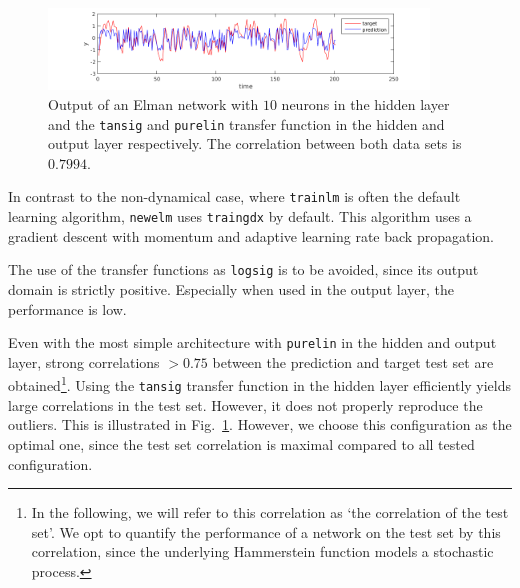 \documentclass[pdftex,11pt,a4paper]{article}
\begin{document}
\begin{figure}[tbh]
\centering
\includegraphics[width=0.9\textwidth]{figs/tansig_purelin.png}
\caption{Output of an Elman network with $10$ neurons in the hidden layer and the \texttt{tansig} and \texttt{purelin} transfer function in the hidden and output layer respectively. The correlation between both data sets is $0.7994$. \label{fig:tansig_purelin}}
\end{figure}

In contrast to the non-dynamical case, where \texttt{trainlm} is often the default learning algorithm, \texttt{newelm} uses \texttt{traingdx} by default. This algorithm uses a gradient descent with momentum and adaptive learning rate back propagation.

The use of the transfer functions as \texttt{logsig} is to be avoided, since its output domain is strictly positive. Especially when used in the output layer, the performance is low.

Even with the most simple architecture with \texttt{purelin} in the hidden and output layer, strong correlations $>0.75$ between the prediction and target test set are obtained\footnote{In the following, we will refer to this correlation as `the correlation of the test set'. We opt to quantify the performance of a network on the test set by this correlation, since the underlying Hammerstein function models a stochastic process.}. Using the \texttt{tansig} transfer function in the hidden layer efficiently yields large correlations in the test set. However, it does not properly reproduce the outliers. This is illustrated in Fig.~\ref{fig:tansig_purelin}. However, we choose this configuration as the optimal one, since the test set correlation is maximal compared to all tested configuration.
\end{document}
